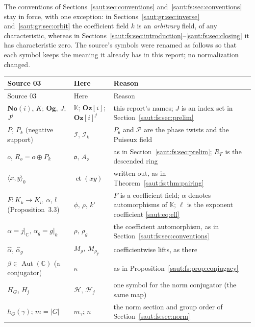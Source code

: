 \documentclass[11pt]{article}
\theoremstyle{definition}
\theoremstyle{remark}
\newcommand{\No}{\mathbf{No}}
\newcommand{\C}{\mathbb C}
\newcommand{\K}{\mathbb K}
\newcommand{\Aut}{\operatorname{Aut}}
\newcommand{\Oz}{\mathbf{Oz}}
\newcommand{\ct}{\operatorname{ct}}
\newcommand{\Ineg}{\mathcal I}
\numberwithin{equation}{section}
\begin{document}
The conventions of Sections~\ref{saut:sec:conventions}
and~\ref{saut:fs:sec:conventions} stay in force, with one exception: in
Sections~\ref{saut:gr:sec:inverse} and~\ref{saut:gr:sec:orbit} the coefficient
field $k$ is an \emph{arbitrary} field, of any characteristic, whereas in
Sections~\ref{saut:fs:sec:introduction}--\ref{saut:fs:sec:closing} it has
characteristic zero. The source's symbols were renamed as follows so that each
symbol keeps the meaning it already has in this report; no normalization changed.
\begin{center}
\small
\begin{longtable}{@{}>{\RaggedRight\arraybackslash}p{}>{\RaggedRight\arraybackslash}p{}>{\RaggedRight\arraybackslash}p{}@{}}
\toprule
Source 03 & Here & Reason\\
\midrule
\endfirsthead
\toprule
Source 03 & Here & Reason\\
\midrule
\endhead
$\No(i)$, $K$; $\mathbf{Og}$, $J$; $J^j$ & $\K$; $\Oz[i]$; $\Oz[i]^j$ & this report's names; $J$ is an index set in Section~\ref{saut:fs:sec:prelim}\\
$P$, $P_k$ (negative support) & $\Ineg$, $\Ineg_k$ & $P_\theta$ and $\mathcal P$ are the phase twists and the Puiseux field\\
$o$, $R_o=o\oplus P_k$ & $\mathfrak o$, $A_{\mathfrak o}$ & as in Section~\ref{saut:fs:sec:prelim}; $R_F$ is the descended ring\\
$\langle x,y\rangle_0$ & $\ct(xy)$ & written out, as in Theorem~\ref{saut:fs:thm:pairing}\\
$F:K_k\to K_l$, $\alpha$, $l$ (Proposition~3.3) & $\phi$, $\rho$, $k'$ & $F$ is a coefficient field; $\alpha$ denotes automorphisms of $\K$; $\ell$ is the exponent coefficient \eqref{saut:eq:ell}\\
$\alpha=j|_\C$, $\alpha_g=g|_k$ & $\rho$, $\rho_g$ & the coefficient automorphism, as in Section~\ref{saut:fs:sec:conventions}\\
$\widehat\alpha$, $\widehat\alpha_g$ & $M_\rho$, $M_{\rho_g}$ & coefficientwise lifts, as there\\
$\beta\in\Aut(\C)$ (a conjugator) & $\kappa$ & as in Proposition~\ref{saut:fs:prop:conjugacy}\\
$H_G$, $H_j$ & $\mathcal H$, $\mathcal H_j$ & one symbol for the norm conjugator (the same map)\\
$h_G(\gamma)$; $m=|G|$ & $m_\gamma$; $n$ & the norm section and group order of Section~\ref{saut:fs:sec:norm}\\

\end{longtable}
\end{center}
\end{document}
